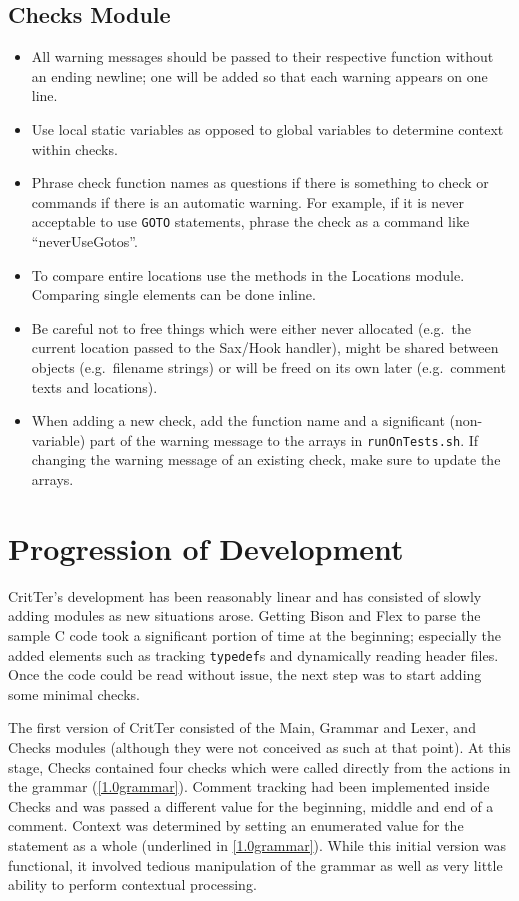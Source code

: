 \documentclass[12pt]{report}
\newcommand{\programName}{CritTer\xspace}
\begin{document}
\section{Checks Module}

\begin{itemize}
\item All warning messages should be passed to their respective function without an ending newline; one will be added so that each warning appears on one line.
\item Use local static variables as opposed to global variables to determine context within checks.
\item Phrase check function names as questions if there is something to check or commands if there is an automatic warning. For example, if it is never acceptable to use \lstinline{GOTO} statements, phrase the check as a command like ``neverUseGotos''.
\item To compare entire locations use the methods in the Locations module. Comparing single elements can be done inline. 
\item Be careful not to free things which were either never allocated (e.g.\ the current location passed to the Sax\slash Hook handler), might be shared between objects (e.g.\ filename strings) or will be freed on its own later (e.g.\ comment texts and locations).
\item When adding a new check, add the function name and a significant (non-variable) part of the warning message to the arrays in \lstinline{runOnTests.sh}. If changing the warning message of an existing check, make sure to update the arrays.
\end{itemize}

\chapter{Progression of Development}
\label{progressionOfDevelopment}

\programName's development has been reasonably linear and has consisted of slowly adding modules 
as new situations arose. Getting Bison and Flex to parse the sample C code took a significant portion of 
time at the beginning; especially the added elements such as tracking \lstinline{typedef}s and 
dynamically reading header files. Once the code could be read without issue, the next step was to start 
adding some minimal checks.

The first version of \programName consisted of the Main, Grammar and Lexer, and Checks modules 
(although they were not conceived as such at that point). At this stage, Checks contained four checks 
which were called directly from the actions in the grammar (\autoref{1.0grammar}). Comment tracking 
had been implemented inside Checks and was passed a different value for the beginning, middle and 
end of a comment. Context was determined by setting an enumerated value for the statement as a whole 
(underlined in \autoref{1.0grammar}). While this initial version was functional, it involved tedious 
manipulation of the grammar as well as very little ability to perform contextual processing.
\end{document}
